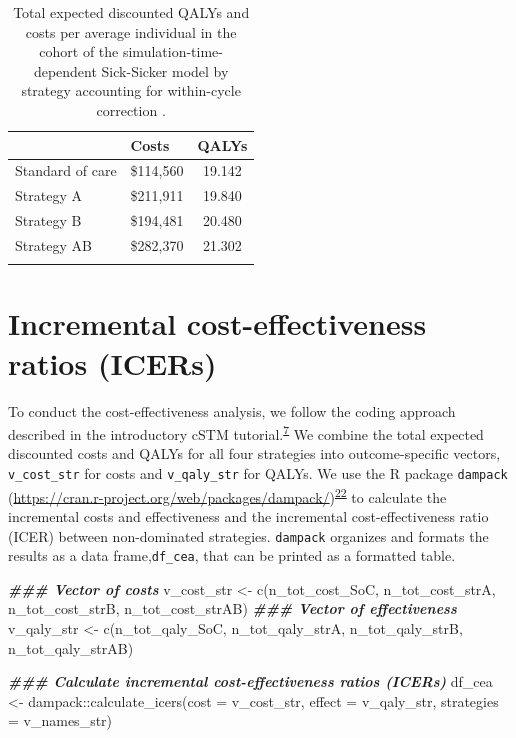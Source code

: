 \documentclass[
]{article}
\newenvironment{Shaded}{\begin{snugshade}}{\end{snugshade}}
\newcommand{\AttributeTok}[1]{\textcolor[rgb]{0.77,0.63,0.00}{#1}}
\newcommand{\DocumentationTok}[1]{\textcolor[rgb]{0.56,0.35,0.01}{\textbf{\textit{#1}}}}
\newcommand{\FunctionTok}[1]{\textcolor[rgb]{0.00,0.00,0.00}{#1}}
\newcommand{\NormalTok}[1]{#1}
\newcommand{\OtherTok}[1]{\textcolor[rgb]{0.56,0.35,0.01}{#1}}
\newcommand{\SpecialCharTok}[1]{\textcolor[rgb]{0.00,0.00,0.00}{#1}}
\begin{document}
\begin{table}[!h]

\caption{\label{tab:Expected-outcomes-table}Total expected discounted QALYs and costs per average individual in the cohort of the simulation-time-dependent Sick-Sicker model by strategy accounting for within-cycle correction .}
\centering
\begin{tabular}[t]{llc}
\toprule{}
  & Costs & QALYs\\
\midrule{}
Standard of care & \$114,560 & 19.142\\
Strategy A & \$211,911 & 19.840\\
Strategy B & \$194,481 & 20.480\\
Strategy AB & \$282,370 & 21.302\\
\bottomrule{}
\end{tabular}
\end{table}

\hypertarget{incremental-cost-effectiveness-ratios-icers}{%
\section{Incremental cost-effectiveness ratios (ICERs)}\label{incremental-cost-effectiveness-ratios-icers}}

To conduct the cost-effectiveness analysis, we follow the coding approach described in the introductory cSTM tutorial.\textsuperscript{\protect\hyperlink{ref-Alarid-Escudero2021a}{7}} We combine the total expected discounted costs and QALYs for all four strategies into outcome-specific vectors, \texttt{v\_cost\_str} for costs and \texttt{v\_qaly\_str} for QALYs. We use the R package \texttt{dampack} (\url{https://cran.r-project.org/web/packages/dampack/})\textsuperscript{\protect\hyperlink{ref-Alarid-Escudero2021}{22}} to calculate the incremental costs and effectiveness and the incremental cost-effectiveness ratio (ICER) between non-dominated strategies. \texttt{dampack} organizes and formats the results as a data frame,\texttt{df\_cea}, that can be printed as a formatted table.

\begin{Shaded}
\begin{Highlighting}[]
\DocumentationTok{\#\#\# Vector of costs}
\NormalTok{v\_cost\_str }\OtherTok{\textless{}{-}} \FunctionTok{c}\NormalTok{(n\_tot\_cost\_SoC, n\_tot\_cost\_strA, n\_tot\_cost\_strB, n\_tot\_cost\_strAB)}
\DocumentationTok{\#\#\# Vector of effectiveness}
\NormalTok{v\_qaly\_str }\OtherTok{\textless{}{-}} \FunctionTok{c}\NormalTok{(n\_tot\_qaly\_SoC, n\_tot\_qaly\_strA, n\_tot\_qaly\_strB, n\_tot\_qaly\_strAB)}

\DocumentationTok{\#\#\# Calculate incremental cost{-}effectiveness ratios (ICERs)}
\NormalTok{df\_cea }\OtherTok{\textless{}{-}}\NormalTok{ dampack}\SpecialCharTok{::}\FunctionTok{calculate\_icers}\NormalTok{(}\AttributeTok{cost =}\NormalTok{ v\_cost\_str, }
                                   \AttributeTok{effect =}\NormalTok{ v\_qaly\_str,}
                                   \AttributeTok{strategies =}\NormalTok{ v\_names\_str)}
\end{Highlighting}
\end{Shaded}
\end{document}
